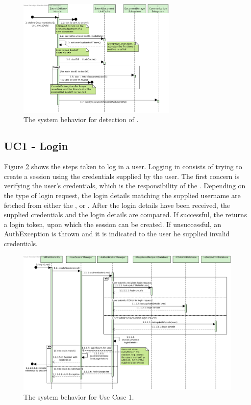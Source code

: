 \begin{figure}[!htp]
    \centering
    \includegraphics[width=0.7\textwidth]{figures/Av3 - Zoomit failure.png}
    \caption{The system behavior for detection of .
        }\label{fig:seq_av3fail}
\end{figure}



\subsection{UC1 - Login}\label{sec:seq_uc1}
Figure \ref{fig:seq_uc1} shows the steps taken to log in a user. Logging in consists of trying to create a session using the credentials supplied by the user. The first concern is verifying the user's credentials, which is the responsibility of the . Depending on the type of login request, the login details matching the supplied username are fetched from either the ,  or . After the login details have been received, the supplied credentials and the login details are compared. If successful, the  returns a login token, upon which the session can be created. If unsuccessful, an AuthException is thrown and it is indicated to the user he supplied invalid credentials.

\begin{figure}[!htp]
    \centering
    \includegraphics[width=\textwidth]{figures/UC1 - Login.png}
    \caption{The system behavior for Use Case 1.
        }\label{fig:seq_uc1}
\end{figure}

